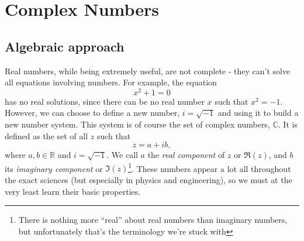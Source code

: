 
\newcommand{\arcc}[3]{
	\draw[#3, fill=#3!20] (0,0) -- (#2,0) arc (0:#1:#2) -- cycle;
}

\newcommand{\cmplxsol}[1]{
	\coordinate (O) at (0,0);
	\draw[black!20] (1,0) arc (0:360:1);
	\pgfmathsetmacro{\dt}{360/#1}
	\pgfmathsetmacro{\n}{int(#1-1)}
	\pgfplotsinvokeforeach{\n,...,0}{
		\pgfmathparse{##1+1}
		\draw[xcol##1, fill=xcol##1!20] (O) -- ({0.1*##1},0) arc (0:{\dt*##1}:{0.1*##1}) -- cycle;
		\draw[very thick, xcol##1] (O) -- ({cos(\dt*##1)},{sin(\dt*##1)}) node[complex]{};
		\node[xcol##1, fill=xcol##1!10, rounded corners]  at ({1.23*cos(\dt*##1)},{1.23*sin(\dt*##1)}) {$z_{\the\numexpr##1+1\relax}$};
	}
}

\section{Complex Numbers}
\subsection{Algebraic approach}
Real numbers, while being extremely useful, are not complete - they can't solve all equations involving numbers. For example, the equation
\begin{equation}
	x^{2} + 1 = 0
	\label{eq:no_real_solutions}
\end{equation}
has no real solutions, since there can be no real number $x$ such that $x^{2}=-1$. However, we can choose to define a new number, $i=\sqrt{-1}$ and using it to build a new number system. This system is of course the set of complex numbers, $\mathbb{C}$. It is defined as the set of all $z$ such that
\begin{equation}
	z = a+ib,
	\label{eq:complex_number}
\end{equation}
where $a,b\in\mathbb{R}$ and $i=\sqrt{-1}$. We call $a$ the \emph{real component} of $z$ or $\Re(z)$, and $b$ its \emph{imaginary component} or $\Im(z)$\footnote{There is nothing more ``real'' about real numbers than imaginary numbers, but unfortunately that's the terminology we're stuck with \shrug}. These numbers appear a lot all throughout the exact sciences (but especially in physics and engineering), so we must at the very least learn their basic properties.


